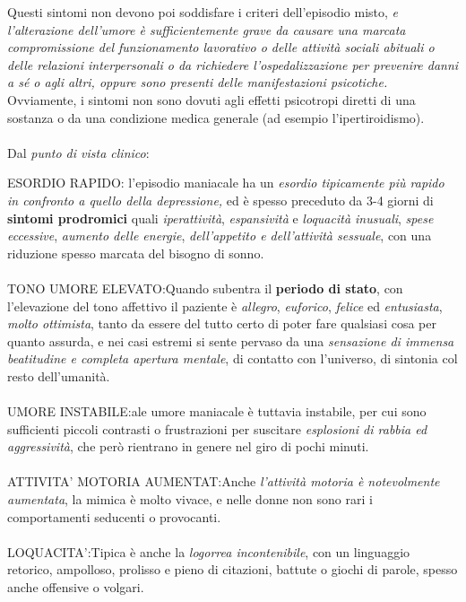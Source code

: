 \begin{itemize}
Questi sintomi non devono poi soddisfare i criteri dell'episodio misto,
\emph{e l'alterazione dell'umore è sufficientemente grave da causare una
marcata compromissione del funzionamento lavorativo o delle attività
sociali abituali o delle relazioni interpersonali o da richiedere
l'ospedalizzazione per prevenire danni a sé o agli altri, oppure sono
presenti delle manifestazioni psicotiche.} Ovviamente, i sintomi non
sono dovuti agli effetti psicotropi diretti di una sostanza o da una
condizione medica generale (ad esempio l'ipertiroidismo).
\\\\
Dal \emph{punto di vista clinico}:

ESORDIO RAPIDO: l'episodio maniacale ha un \emph{esordio tipicamente più
rapido in confronto a quello della depressione,} ed è spesso preceduto
da 3-4 giorni di \textbf{sintomi prodromici} quali \emph{iperattività},
\emph{espansività} e \emph{loquacità inusuali}, \emph{spese eccessive},
\emph{aumento delle energie}, \emph{dell'appetito e dell'attività
sessuale}, con una riduzione spesso marcata del bisogno di sonno.
\\\\
TONO UMORE ELEVATO:Quando subentra il \textbf{periodo di stato}, con
l'elevazione del tono affettivo il paziente è \emph{allegro},
\emph{euforico}, \emph{felice} ed \emph{entusiasta}, \emph{molto
ottimista}, tanto da essere del tutto certo di poter fare qualsiasi cosa
per quanto assurda, e nei casi estremi si sente pervaso da una
\emph{sensazione di immensa beatitudine e completa apertura mentale}, di
contatto con l'universo, di sintonia col resto dell'umanità.
\\\\
UMORE INSTABILE:ale umore maniacale è tuttavia instabile, per cui sono
sufficienti piccoli contrasti o frustrazioni per suscitare
\emph{esplosioni di rabbia ed aggressività}, che però rientrano in
genere nel giro di pochi minuti.
\\\\
ATTIVITA' MOTORIA AUMENTAT:Anche \emph{l'attività motoria è notevolmente
aumentata}, la mimica è molto vivace, e nelle donne non sono rari i
comportamenti seducenti o provocanti.
\\\\
LOQUACITA':Tipica è anche la \emph{logorrea incontenibile}, con un
linguaggio retorico, ampolloso, prolisso e pieno di citazioni, battute o
giochi di parole, spesso anche offensive o volgari.
\\\\

\end{itemize}
